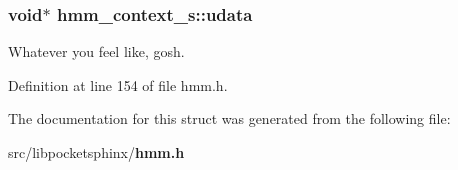 \subsubsection[{udata}]{\setlength{\rightskip}{0pt plus 5cm}void$\ast$ hmm\-\_\-context\-\_\-s\-::udata}\label{structhmm__context__s_a1f80af93746230d41b4ee7e89786a4c7}


Whatever you feel like, gosh. 



Definition at line 154 of file hmm.\-h.



The documentation for this struct was generated from the following file\-:\begin{DoxyCompactItemize}
\item 
src/libpocketsphinx/{\bf hmm.\-h}\end{DoxyCompactItemize}
